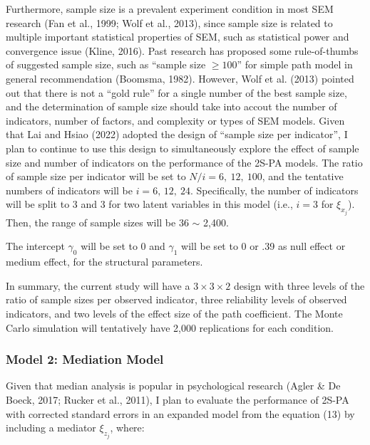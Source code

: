 \documentclass[
  man]{apa6}
\begin{document}
Furthermore, sample size is a prevalent experiment condition in most SEM research (Fan et al., 1999; Wolf et al., 2013), since sample size is related to multiple important statistical properties of SEM, such as statistical power and convergence issue (Kline, 2016). Past research has proposed some rule-of-thumbs of suggested sample size, such as ``sample size \(\ge 100\)'' for simple path model in general recommendation (Boomsma, 1982). However, Wolf et al. (2013) pointed out that there is not a ``gold rule'' for a single number of the best sample size, and the determination of sample size should take into accout the number of indicators, number of factors, and complexity or types of SEM models. Given that Lai and Hsiao (2022) adopted the design of ``sample size per indicator'', I plan to continue to use this design to simultaneously explore the effect of sample size and number of indicators on the performance of the 2S-PA models. The ratio of sample size per indicator will be set to \(N/i = 6, \ 12, \ 100\), and the tentative numbers of indicators will be \(i = 6, \, 12, \ 24\). Specifically, the number of indicators will be split to 3 and 3 for two latent variables in this model (i.e., \(i = 3\) for \(\xi_{x_{j}}\)). Then, the range of sample sizes will be 36 \(\sim\) 2,400.

The intercept \(\gamma_{0}\) will be set to 0 and \(\gamma_{1}\) will be set to 0 or .39 as null effect or medium effect, for the structural parameters.

In summary, the current study will have a \(3 \times 3 \times 2\) design with three levels of the ratio of sample sizes per observed indicator, three reliability levels of observed indicators, and two levels of the effect size of the path coefficient. The Monte Carlo simulation will tentatively have 2,000 replications for each condition.

\hypertarget{model-2-mediation-model}{%
\subsubsection{Model 2: Mediation Model}\label{model-2-mediation-model}}

Given that median analysis is popular in psychological research (Agler \& De Boeck, 2017; Rucker et al., 2011), I plan to evaluate the performance of 2S-PA with corrected standard errors in an expanded model from the equation (13) by including a mediator \(\xi_{z_{j}}\), where:
\end{document}
